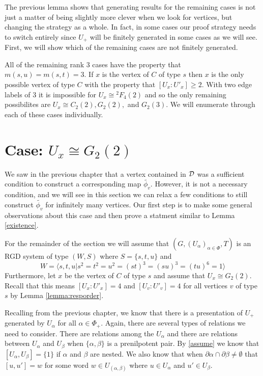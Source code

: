 \documentclass[class=book, crop=false]{standalone}
\begin{document}
The previous lemma shows that generating results for the remaining cases is not just a matter of being slightly more clever when we look for vertices, but changing the strategy as a whole. In fact, in some cases our proof strategy needs to switch entirely since $U_+$ will be finitely generated in some cases as we will see. First, we will show which of the remaining cases are not finitely generated.

All of the remaining rank 3 cases have the property that $m(s,u)=m(s,t)=3.$ If $x$ is the vertex of $C$ of type $s$ then $x$ is the only possible vertex of type $C$ with the property that $[U_x:U'_x]\ge 2.$ With two edge labels of $3$ it is impossible for $U_x\cong {}^2F_4(2)$ and so the only remaining possibilites are $U_x\cong C_2(2),G_2(2),$ and $G_2(3).$ We will enumerate through each of these cases individually.

\section{Case: $U_x\cong G_2(2)$}
We saw in the previous chapter that a vertex contained in $\mathcal{D}$ was a sufficient condition to construct a corresponding map $\tilde{\phi_v}.$ However, it is not a necessary condition, and we will see in this section we can relax a few conditions to still construct $\tilde{\phi_v}$ for infinitely many vertices. Our first step is to make some general observations about this case and then prove a statment similar to Lemma \ref{existence}.

For the remainder of the section we will assume that $(G,(U_\alpha)_{\alpha\in \Phi},T)$ is an RGD system of type $(W,S)$ where $S=\{s,t,u\}$ and 
\[
	W=\langle s,t,u|s^2=t^2=u^2=(st)^3=(su)^3=(tu)^6=1\rangle
\]
Furthermore, let $x$ be the vertex of $C$ of type $s$ and assume that $U_x\cong G_2(2).$ Recall that this means $[U_x:U'_x]=4$ and $[U_v:U'_v]=4$ for all vertices $v$ of type $s$ by Lemma \ref{lemma:resporder}.

Recalling from the previous chapter, we know that there is a presentation of $U_+$ generated by $U_\alpha$ for all $\alpha\in \Phi_+.$ Again, there are several types of relations we need to consider. There are relations among the $U_\alpha$ and there are relations between $U_\alpha$ and $U_\beta$ when $\{\alpha,\beta\}$ is a prenilpotent pair. By \eqref{assume} we know that $[U_\alpha,U_\beta]=\{1\}$ if $\alpha$ and $\beta$ are nested. We also know that when $\partial\alpha\cap \partial\beta\neq \emptyset$ that $[u,u']=w$ for some word $w\in U_{(\alpha,\beta)}$ where $u\in U_\alpha$ and $u'\in U_\beta.$ 
\end{document}
